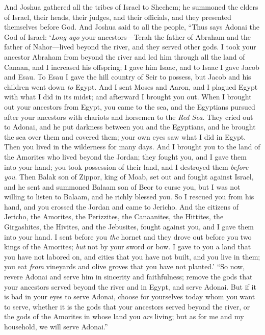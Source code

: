 \begin{biblechapter} %
 And Joshua gathered all the tribes of Israel to Shechem; he summoned the elders of Israel, their heads, their judges, and their officials, and they presented themselves before God.
\verse And Joshua said to all the people, “Thus says Adonai the God of Israel: ‘\textit{Long ago} your ancestors—Terah the father of Abraham and the father of Nahor—lived beyond the river, and they served other gods.
\verse I took your ancestor Abraham from beyond the river and led him through all the land of Canaan, and I increased his offspring; I gave him Isaac,
\verse and to Isaac I gave Jacob and Esau. To Esau I gave the hill country of Seir to possess, but Jacob and his children went down \textit{to} Egypt.
\verse And I sent Moses and Aaron, and I plagued Egypt with what I did in its midst; and afterward I brought you out.
\verse When I brought out your ancestors from Egypt, you came to the sea, and the Egyptians pursued after your ancestors with chariots and horsemen to the \textit{Red Sea}.
\verse They cried out to Adonai, and he put darkness between you and the Egyptians, and he brought the sea over them and covered them; your own eyes saw what I did in Egypt. Then you lived in the wilderness for many days.
\verse And I brought you to the land of the Amorites who lived beyond the Jordan; they fought you, and I gave them into your hand; you took possession of their land, and I destroyed them \textit{before you}.
\verse Then Balak son of Zippor, king of Moab, set out and fought against Israel, and he sent and summoned Balaam son of Beor to curse you,
\verse but I was not willing to listen to Balaam, and he richly blessed you. So I rescued you from his hand,
\verse and you crossed the Jordan and came to Jericho. And the citizens of Jericho, the Amorites, the Perizzites, the Canaanites, the Hittites, the Girgashites, the Hivites, and the Jebusites, fought against you, and I gave them into your hand.
\verse I sent before you \textit{the} hornet and they drove out before you two kings of the Amorites; \textit{but} not by your sword or bow.
\verse I gave to you a land that you have not labored on, and cities that you have not built, and you live in them; you eat \textit{from} vineyards and olive groves that you have not planted.’
 “So now, revere Adonai and serve him in sincerity and faithfulness; remove the gods that your ancestors served beyond the river and in Egypt, and serve Adonai.
\verse But if it is bad in your eyes to serve Adonai, choose for yourselves today whom you want to serve, whether it is the gods that your ancestors served beyond the river, or the gods of the Amorites in whose land you \textit{are} living; but as for me and my household, we will serve Adonai.”

\end{biblechapter}
